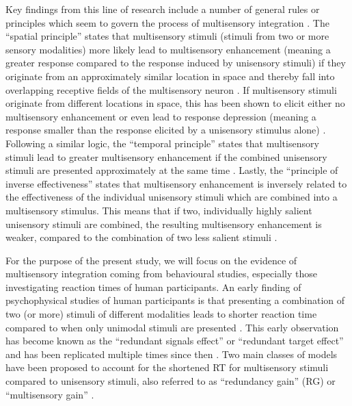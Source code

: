\documentclass[12pt]{article}
\begin{document}
%
\par Key findings from this line of research include a number of general rules or principles which seem to govern the process of multisensory integration \parencite[for review, see][]{meredith_interactions_1983,stein_merging_1993}. The “spatial principle” states that multisensory stimuli (stimuli from two or more sensory modalities) more likely lead to multisensory enhancement (meaning a greater response compared to the response induced by unisensory stimuli) if they originate from an approximately similar location in space and thereby fall into overlapping receptive fields of the multisensory neuron \parencite{kadunce_influence_2001, wallace_representation_1996}. If multisensory stimuli originate from different locations in space, this has been shown to elicit either no multisensory enhancement or even lead to response depression (meaning a response smaller than the response elicited by a unisensory stimulus alone) \parencite{meredith_spatial_1996,wallace_representation_1996}. Following a similar logic, the “temporal principle” states that multisensory stimuli lead to greater multisensory enhancement if the combined unisensory stimuli are presented approximately at the same time \parencite{meredith_determinants_1987,recanzone_auditory_2003,wallace_representation_1996}. Lastly, the “principle of inverse effectiveness” states that multisensory enhancement is inversely related to the effectiveness of the individual unisensory stimuli which are combined into a multisensory stimulus. This means that if two, individually highly salient unisensory stimuli are combined, the resulting multisensory enhancement is weaker, compared to the combination of two less salient stimuli  \parencite{alex_meredith_spatial_1986,perrault_superior_2005,wallace_representation_1996}. 
%
\par For the purpose of the present study, we will focus on the evidence of multisensory integration coming from behavioural studies, especially those investigating reaction times of human participants. An early finding of psychophysical studies of human participants is that presenting a combination of two (or more) stimuli of different modalities leads to shorter reaction time compared to when only unimodal stimuli are presented \parencite{hershenson_reaction_1962,todd_reaction_1912}. This early observation has become known as the “redundant signals effect” or “redundant target effect” \parencite{kinchla_detecting_1974,miller_divided_1982,miller_timecourse_1986} and has been replicated multiple times since then \parencite{diederich_bimodal_2004,hughes_visual-auditory_1994,schroger_speeded_1998}. Two main classes of models have been proposed to account for the shortened RT for multisensory stimuli compared to unisensory stimuli, also referred to as “redundancy gain” (RG) or “multisensory gain” \parencite{miller_divided_1982,miller_timecourse_1986,ridgway_redundant_2008,dykes_investigation_1978}. 
\end{document}
